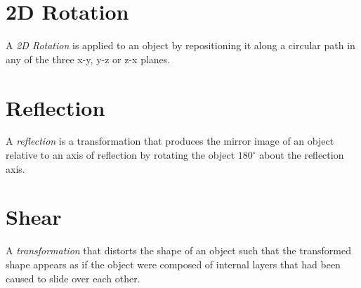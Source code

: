 \documentclass[a4paper,12pt,titlepage,twosided]{article}
\begin{document}
\pagebreak
\section{2D Rotation}
A \emph{2D Rotation} is applied to an object by repositioning it along a circular path in any of the three x-y, y-z or z-x planes.

\pagebreak
\section{Reflection}
A \emph{reflection} is a transformation that produces the mirror image of an object relative to an axis of reflection by rotating the object $180^\circ$ about the reflection axis. 
\pagebreak
\section{Shear}
A \emph{transformation} that distorts the shape of an object such that the transformed shape appears as if the object were composed of internal layers that had been caused to slide over each other.

\pagebreak
\end{document}

